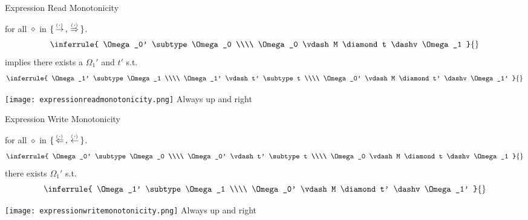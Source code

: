 \documentclass[12pt,twoside]{report}
\begin{document}
\begin{Property}{Expression Read Monotonicity}{}
  \begin{minipage}{0.6\textwidth}
    \centering
    for all $\diamond$ in $\{  \,\stackrel{_(._)}{\rightarrow}\,, \,\stackrel{_(._)}{\Rightarrow}\,  \}$.
    \[\inferrule{
      \Omega_0' \subtype \Omega_0 \\\\
      \Omega_0 \vdash M \diamond t \dashv \Omega_1
    }{}\]
    implies there exists a $\Omega_1'$ and $t'$ s.t.
    \[\inferrule{
      \Omega_1' \subtype \Omega_1 \\\\
      \Omega_1' \vdash t' \subtype t \\\\
      \Omega_0' \vdash M \diamond t' \dashv \Omega_1' 
    }{}\]
  \end{minipage}
  \begin{minipage}{0.3\textwidth}
    \centering
    \texttt{[image: expressionreadmonotonicity.png]}
    Always up and right
  \end{minipage}
  \label{property:expressionreadmonotonicity}
\end{Property}

\begin{Property}{Expression Write Monotonicity}{} %
  \begin{minipage}{0.6\textwidth}
    \centering
    for all $\diamond$ in $\{  \,\stackrel{_(._)}{\Leftarrow}\,, \,\stackrel{_(._)}{\leftarrow}\,  \}$.
    \[\inferrule{
      \Omega_0' \subtype \Omega_0 \\\\
      \Omega_0' \vdash t' \subtype t \\\\
      \Omega_0 \vdash M \diamond t \dashv \Omega_1
    }{}\]
    there exists $\Omega_1'$ s.t.
    \[\inferrule{
      \Omega_1' \subtype \Omega_1 \\\\
      \Omega_0' \vdash M \diamond t' \dashv \Omega_1' 
    }{}\]
  \end{minipage}
  \begin{minipage}{0.3\textwidth}
    \centering
    \texttt{[image: expressionwritemonotonicity.png]}
    Always up and right
  \end{minipage}
  \label{property:expressionwritemonotonicity}
\end{Property}
\end{document}

